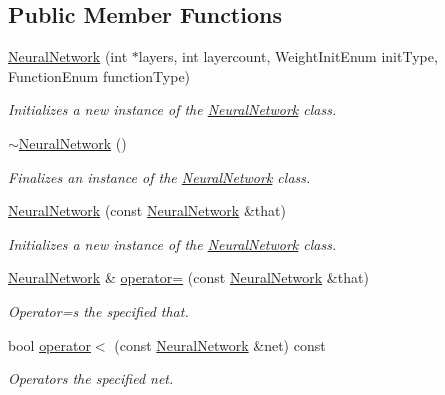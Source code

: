 \subsection*{Public Member Functions}
\begin{DoxyCompactItemize}
\item 
\hyperlink{class_n_n_t_lib_1_1_neural_network_ab49cda4bda3cba756cb206727e429ebd}{Neural\+Network} (int $\ast$layers, int layercount, Weight\+Init\+Enum init\+Type, Function\+Enum function\+Type)
\begin{DoxyCompactList}\small\item\em Initializes a new instance of the \hyperlink{class_n_n_t_lib_1_1_neural_network}{Neural\+Network} class. \end{DoxyCompactList}\item 
\hyperlink{class_n_n_t_lib_1_1_neural_network_a634613b66f5441f58a2e5d7c7b1c3da9}{$\sim$\+Neural\+Network} ()
\begin{DoxyCompactList}\small\item\em Finalizes an instance of the \hyperlink{class_n_n_t_lib_1_1_neural_network}{Neural\+Network} class. \end{DoxyCompactList}\item 
\hyperlink{class_n_n_t_lib_1_1_neural_network_a21c3863f38585268af2532b027a42d6b}{Neural\+Network} (const \hyperlink{class_n_n_t_lib_1_1_neural_network}{Neural\+Network} \&that)
\begin{DoxyCompactList}\small\item\em Initializes a new instance of the \hyperlink{class_n_n_t_lib_1_1_neural_network}{Neural\+Network} class. \end{DoxyCompactList}\item 
\hyperlink{class_n_n_t_lib_1_1_neural_network}{Neural\+Network} \& \hyperlink{class_n_n_t_lib_1_1_neural_network_add5684447063d835c50ec511a5f28091}{operator=} (const \hyperlink{class_n_n_t_lib_1_1_neural_network}{Neural\+Network} \&that)
\begin{DoxyCompactList}\small\item\em Operator=s the specified that. \end{DoxyCompactList}\item 
bool \hyperlink{class_n_n_t_lib_1_1_neural_network_a147a7fe89871c02c6fa8c9d691327e0e}{operator$<$} (const \hyperlink{class_n_n_t_lib_1_1_neural_network}{Neural\+Network} \&net) const 
\begin{DoxyCompactList}\small\item\em Operators the specified net. \end{DoxyCompactList}\item 

\end{DoxyCompactItemize}
